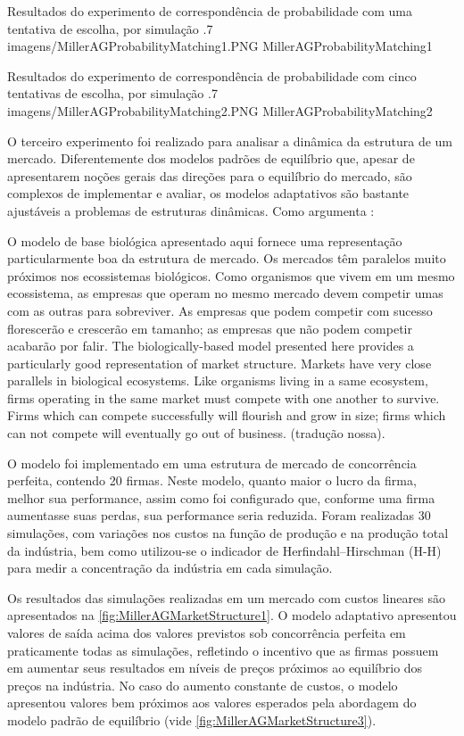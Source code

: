 \figura
	{Resultados do experimento de correspondência de probabilidade com uma tentativa de escolha, por simulação}
	{.7}
	{imagens/MillerAGProbabilityMatching1.PNG}
	{MillerAGProbabilityMatching1}
	{}

\figura
	{Resultados do experimento de correspondência de probabilidade com cinco tentativas de escolha, por simulação}
	{.7}
	{imagens/MillerAGProbabilityMatching2.PNG}
	{MillerAGProbabilityMatching2}
	{}
	
O terceiro experimento foi realizado para analisar a dinâmica da estrutura de um mercado. Diferentemente dos modelos padrões de equilíbrio que, apesar de apresentarem noções gerais das direções para o equilíbrio do mercado, são complexos de implementar e avaliar, os modelos adaptativos são bastante ajustáveis a problemas de estruturas dinâmicas. Como argumenta :

\citacao
	{%
		O modelo de base biológica apresentado aqui fornece uma representação particularmente boa da estrutura de mercado. Os mercados têm paralelos muito próximos nos ecossistemas biológicos. Como organismos que vivem em um mesmo ecossistema, as empresas que operam no mesmo mercado devem competir umas com as outras para sobreviver. As empresas que podem competir com sucesso florescerão e crescerão em tamanho; as empresas que não podem competir acabarão por falir.
	}{%
		The biologically-based model presented here provides a particularly good representation of market structure. Markets have very close parallels in biological ecosystems. Like organisms living in a same ecosystem, firms operating in the same market must compete with one another to survive. Firms which can compete successfully will flourish and grow in size; firms which can not compete will eventually go out of business.
	}
	{\citep[p.11]{miller_1986}}
	{(tradução nossa).}

O modelo foi implementado em uma estrutura de mercado de concorrência perfeita, contendo 20 firmas. Neste modelo, quanto maior o lucro da firma, melhor sua performance, assim como foi configurado que, conforme uma firma aumentasse suas perdas, sua performance seria reduzida. Foram realizadas 30 simulações, com variações nos custos na função de produção e na produção total da indústria, bem como utilizou-se o indicador de Herfindahl–Hirschman (H-H) para medir a concentração da indústria em cada simulação.

Os resultados das simulações realizadas em um mercado com custos lineares são apresentados na \autoref{fig:MillerAGMarketStructure1}. O modelo adaptativo apresentou valores de saída acima dos valores previstos sob concorrência perfeita em praticamente todas as simulações, refletindo o incentivo que as firmas possuem em aumentar seus resultados em níveis de preços próximos ao equilíbrio dos preços na indústria. No caso do aumento constante de custos, o modelo apresentou valores bem próximos aos valores esperados pela abordagem do modelo padrão de equilíbrio (vide \autoref{fig:MillerAGMarketStructure3}).

